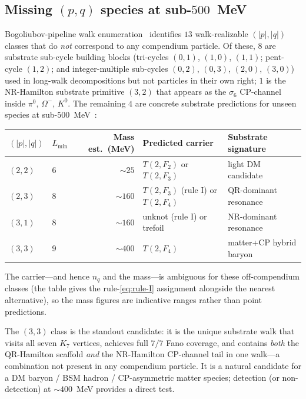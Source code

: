 \documentclass[11pt]{article}
\begin{document}
\subsection{Missing $(p, q)$ species at sub-$500$~MeV}
\label{sec:missing-pq}

Bogoliubov-pipeline walk enumeration~\cite{BogoliubovPipeline} identifies $13$ walk-realizable $(|p|, |q|)$ classes that do \emph{not} correspond to any compendium particle.  Of these, $8$ are substrate sub-cycle building blocks (tri-cycles $(0, 1)$, $(1, 0)$, $(1, 1)$; pent-cycle $(1, 2)$; and integer-multiple sub-cycles $(0, 2)$, $(0, 3)$, $(2, 0)$, $(3, 0)$) used in long-walk decompositions but not particles in their own right; $1$ is the NR-Hamilton substrate primitive $(3, 2)$ that appears as the $\sigma_6$ CP-channel inside $\pi^0$, $\Omega^-$, $K^0$.  The remaining $4$ are concrete substrate predictions for unseen species at sub-$500$~MeV~\cite{missing-pq-predictions}:

\begin{center}
\begin{tabular}{llrll}
\toprule
$(|p|, |q|)$ & $L_{\min}$ & Mass est.\ (MeV) & Predicted carrier & Substrate signature \\
\midrule
$(2, 2)$ & 6 & $\sim 25$  & $T(2, F_2)$ or $T(2, F_3)$ & light DM candidate \\
$(2, 3)$ & 8 & $\sim 160$ & $T(2, F_3)$ (rule I) or $T(2, F_4)$ & QR-dominant resonance \\
$(3, 1)$ & 8 & $\sim 160$ & unknot (rule I) or trefoil      & NR-dominant resonance \\
$(3, 3)$ & 9 & $\sim 400$ & $T(2, F_4)$              & matter+CP hybrid baryon \\
\bottomrule
\end{tabular}
\end{center}

The carrier---and hence $n_q$ and the mass---is ambiguous for these off-compendium classes (the table gives the rule-\eqref{eq:rule-I} assignment alongside the nearest alternative), so the mass figures are indicative ranges rather than point predictions.

The $(3, 3)$ class is the standout candidate: it is the unique substrate walk that visits all seven $K_7$ vertices, achieves full $7/7$ Fano coverage, and contains \emph{both} the QR-Hamilton scaffold \emph{and} the NR-Hamilton CP-channel tail in one walk---a combination not present in any compendium particle.  It is a natural candidate for a DM baryon / BSM hadron / CP-asymmetric matter species; detection (or non-detection) at $\sim 400$~MeV provides a direct test.
\end{document}
